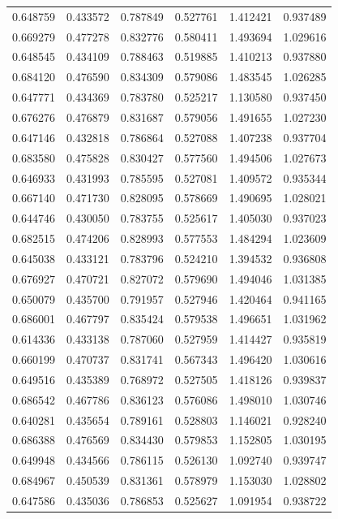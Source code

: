 \begin{table}[htbp]
\begin{center}
\begin{tabular}{ |c|c|c|c|c|c| }
        0.648759 & 0.433572 & 0.787849 & 0.527761 & 1.412421 & 0.937489 \\
        0.669279 & 0.477278 & 0.832776 & 0.580411 & 1.493694 & 1.029616 \\
        0.648545 & 0.434109 & 0.788463 & 0.519885 & 1.410213 & 0.937880 \\
        0.684120 & 0.476590 & 0.834309 & 0.579086 & 1.483545 & 1.026285 \\
        0.647771 & 0.434369 & 0.783780 & 0.525217 & 1.130580 & 0.937450 \\
        0.676276 & 0.476879 & 0.831687 & 0.579056 & 1.491655 & 1.027230 \\
        0.647146 & 0.432818 & 0.786864 & 0.527088 & 1.407238 & 0.937704 \\
        0.683580 & 0.475828 & 0.830427 & 0.577560 & 1.494506 & 1.027673 \\
        0.646933 & 0.431993 & 0.785595 & 0.527081 & 1.409572 & 0.935344 \\
        0.667140 & 0.471730 & 0.828095 & 0.578669 & 1.490695 & 1.028021 \\
        0.644746 & 0.430050 & 0.783755 & 0.525617 & 1.405030 & 0.937023 \\
        0.682515 & 0.474206 & 0.828993 & 0.577553 & 1.484294 & 1.023609 \\
        0.645038 & 0.433121 & 0.783796 & 0.524210 & 1.394532 & 0.936808 \\
        0.676927 & 0.470721 & 0.827072 & 0.579690 & 1.494046 & 1.031385 \\
        0.650079 & 0.435700 & 0.791957 & 0.527946 & 1.420464 & 0.941165 \\
        0.686001 & 0.467797 & 0.835424 & 0.579538 & 1.496651 & 1.031962 \\
        0.614336 & 0.433138 & 0.787060 & 0.527959 & 1.414427 & 0.935819 \\
        0.660199 & 0.470737 & 0.831741 & 0.567343 & 1.496420 & 1.030616 \\
        0.649516 & 0.435389 & 0.768972 & 0.527505 & 1.418126 & 0.939837 \\
        0.686542 & 0.467786 & 0.836123 & 0.576086 & 1.498010 & 1.030746 \\
        0.640281 & 0.435654 & 0.789161 & 0.528803 & 1.146021 & 0.928240 \\
        0.686388 & 0.476569 & 0.834430 & 0.579853 & 1.152805 & 1.030195 \\
        0.649948 & 0.434566 & 0.786115 & 0.526130 & 1.092740 & 0.939747 \\
        0.684967 & 0.450539 & 0.831361 & 0.578979 & 1.153030 & 1.028802 \\
        0.647586 & 0.435036 & 0.786853 & 0.525627 & 1.091954 & 0.938722 \\
     \hline
    \end{tabular}
    \end{center}
    \label{intel-perf-2}
\end{table}

